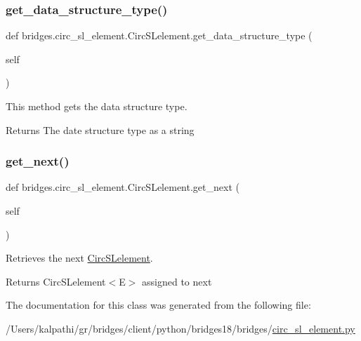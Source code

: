 \subsubsection{\texorpdfstring{get\+\_\+data\+\_\+structure\+\_\+type()}{get\_data\_structure\_type()}}
{\footnotesize\ttfamily def bridges.\+circ\+\_\+sl\+\_\+element.\+Circ\+S\+Lelement.\+get\+\_\+data\+\_\+structure\+\_\+type (\begin{DoxyParamCaption}\item[{}]{self }\end{DoxyParamCaption})}



This method gets the data structure type. 

\begin{DoxyReturn}{Returns}
The date structure type as a string 
\end{DoxyReturn}
\mbox{\label{classbridges_1_1circ__sl__element_1_1_circ_s_lelement_acd9041487068ad5b8e9b68dfcdff4829}} 
\subsubsection{\texorpdfstring{get\+\_\+next()}{get\_next()}}
{\footnotesize\ttfamily def bridges.\+circ\+\_\+sl\+\_\+element.\+Circ\+S\+Lelement.\+get\+\_\+next (\begin{DoxyParamCaption}\item[{}]{self }\end{DoxyParamCaption})}



Retrieves the next \mbox{\hyperlink{classbridges_1_1circ__sl__element_1_1_circ_s_lelement}{Circ\+S\+Lelement}}. 

\begin{DoxyReturn}{Returns}
Circ\+S\+Lelement$<$\+E$>$ assigned to next 
\end{DoxyReturn}


The documentation for this class was generated from the following file\+:\begin{DoxyCompactItemize}
\item 
/\+Users/kalpathi/gr/bridges/client/python/bridges18/bridges/\mbox{\hyperlink{circ__sl__element_8py}{circ\+\_\+sl\+\_\+element.\+py}}\end{DoxyCompactItemize}
